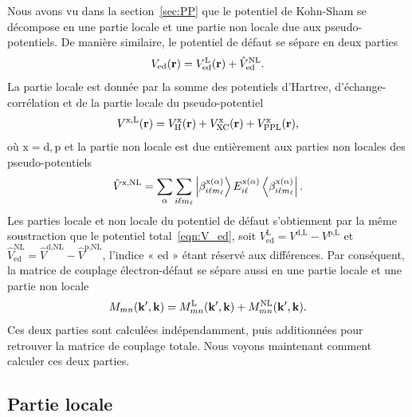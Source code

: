 Nous avons vu dans la section~\ref{sec:PP} que le potentiel de Kohn-Sham se décompose en une partie locale et une partie non locale due aux pseudo-potentiels. De manière similaire, le potentiel de défaut se sépare en deux parties
\begin{equation}
    V_\text{ed}(\mathbf{r}) = V_\text{ed}^\text{L}(\mathbf{r})+\hat{V}_\text{ed}^\text{NL}.
\end{equation}
La partie locale est donnée par la somme des potentiels d'Hartree, d'échange-corrélation et de la partie locale du pseudo-potentiel
\begin{equation}
    V^\text{x,L}(\mathbf{r}) = V_\text{H}^\text{x}(\mathbf{r}) + V_\text{XC}^\text{x}(\mathbf{r})+V_\text{PPL}^\text{x}(\mathbf{r}),
\end{equation}
où $\text{x} = \text{d},\text{p}$ et la partie non locale est due entièrement aux parties non locales des pseudo-potentiels
\begin{equation}
    \hat{V}^\text{x,NL} = \sum_{\alpha}\sum_{i\ell m_\ell}\ket{\beta_{i\ell m_\ell}^{\text{x}(\alpha)}}E_{i\ell}^{\text{x}(\alpha)}\bra{\beta_{i\ell m_\ell}^{\text{x}(\alpha)}}.\label{eqn:V_ed_NL}
\end{equation}
Les parties locale et non locale du potentiel de défaut s'obtiennent par la même soustraction que le potentiel total~\eqref{eqn:V_ed}, soit $V_\text{ed}^\text{L} = V^\text{d,L}-V^\text{p,L}$ et $\hat{V}_\text{ed}^\text{NL} = \hat{V}^\text{d,NL}-\hat{V}^\text{p,NL}$, l'indice « ed » étant réservé aux différences. Par conséquent, la matrice de couplage électron-défaut se sépare aussi en une partie locale et une partie non locale
\begin{equation}
    M_{mn}(\mathbf{k}',\mathbf{k}) = M_{mn}^\text{L}(\mathbf{k}',\mathbf{k}) + M_{mn}^\text{NL}(\mathbf{k}',\mathbf{k}).
\end{equation}
Ces deux parties sont calculées indépendamment, puis additionnées pour retrouver la matrice de couplage totale. Nous voyons maintenant comment calculer ces deux parties.

\subsection{Partie locale}\label{sec:M_local}

